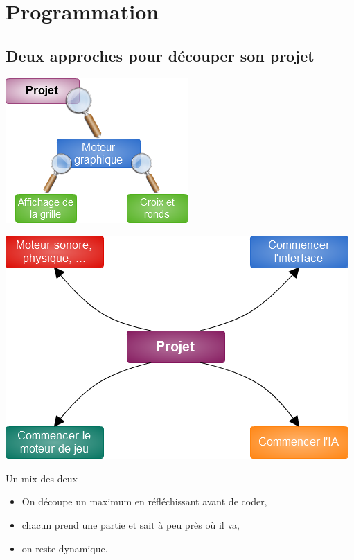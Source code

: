 
\section{Programmation}

\subsection{Deux approches pour découper son projet}
\begin{frame}
  \begin{center}
    \includegraphics[scale=0.6]{images/slide1.png}
  \end{center}
\end{frame}

\begin{frame}
  \begin{center}
    \includegraphics[scale=0.5]{images/slide2.png}
  \end{center}
\end{frame}

\begin{frame}
  \begin{block}{Un mix des deux}
    \begin{itemize}
      \item On découpe un maximum en réfléchissant avant de coder,
      \item chacun prend une partie et sait à peu près où il va,
      \item on reste dynamique.
    \end{itemize}
  \end{block}
\end{frame}